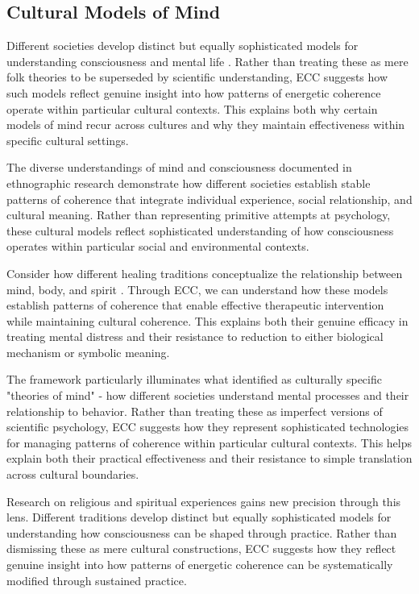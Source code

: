 \subsection{Cultural Models of Mind}

Different societies develop distinct but equally sophisticated models for understanding consciousness and mental life \cite{luhrmann2012when}. Rather than treating these as mere folk theories to be superseded by scientific understanding, ECC suggests how such models reflect genuine insight into how patterns of energetic coherence operate within particular cultural contexts. This explains both why certain models of mind recur across cultures and why they maintain effectiveness within specific cultural settings.

The diverse understandings of mind and consciousness documented in ethnographic research \cite{hollan2000constructivist} demonstrate how different societies establish stable patterns of coherence that integrate individual experience, social relationship, and cultural meaning. Rather than representing primitive attempts at psychology, these cultural models reflect sophisticated understanding of how consciousness operates within particular social and environmental contexts.

Consider how different healing traditions conceptualize the relationship between mind, body, and spirit \cite{csordas1994sacred}. Through ECC, we can understand how these models establish patterns of coherence that enable effective therapeutic intervention while maintaining cultural coherence. This explains both their genuine efficacy in treating mental distress and their resistance to reduction to either biological mechanism or symbolic meaning.

The framework particularly illuminates what \cite{levy1973tahitians} identified as culturally specific "theories of mind" - how different societies understand mental processes and their relationship to behavior. Rather than treating these as imperfect versions of scientific psychology, ECC suggests how they represent sophisticated technologies for managing patterns of coherence within particular cultural contexts. This helps explain both their practical effectiveness and their resistance to simple translation across cultural boundaries.

Research on religious and spiritual experiences \cite{luhrmann2012when} gains new precision through this lens. Different traditions develop distinct but equally sophisticated models for understanding how consciousness can be shaped through practice. Rather than dismissing these as mere cultural constructions, ECC suggests how they reflect genuine insight into how patterns of energetic coherence can be systematically modified through sustained practice.

